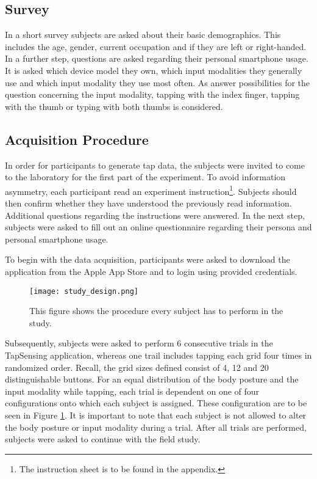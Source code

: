 \subsection{Survey}
In a short survey subjects are asked about their basic demographics. This includes the age, gender, current occupation and if they are left or right-handed. In a further step, questions are asked regarding their personal smartphone usage. It is asked which device model they own, which input modalities they generally use and which input modality they use most often. As answer possibilities for the question concerning the input modality, tapping with the index finger, tapping with the thumb or typing with both thumbs is considered.

\subsection{Acquisition Procedure}
In order for participants to generate tap data, the subjects were invited to come to the laboratory for the first part of the experiment. To avoid information asymmetry, each participant read an experiment instruction\footnote{The instruction sheet is to be found in the appendix.}. Subjects should then confirm whether they have understood the previously read information. Additional questions regarding the instructions were answered. In the next step, subjects were asked to fill out an online questionnaire regarding their persona and personal smartphone usage.

To begin with the data acquisition, participants were asked to download the application from the Apple App Store and to login using provided credentials.

\begin{figure}[h!]
  \centering
  \texttt{[image: study\_design.png]}
  \caption{This figure shows the procedure every subject has to perform in the study.} \label{fig:study_design}
\end{figure}

Subsequently, subjects were asked to perform 6 consecutive trials in the TapSensing application, whereas one trail includes tapping each grid four times in randomized order. Recall, the grid sizes defined consist of 4, 12 and 20 distinguishable buttons. For an equal distribution of the body posture and the input modality while tapping, each trial is dependent on one of four configurations onto which each subject is assigned. These configuration are to be seen in Figure \ref{fig:study_design}.  It is important to note that each subject is not allowed to alter the body posture or input modality during a trial. After all trials are performed, subjects were asked to continue with the field study.

